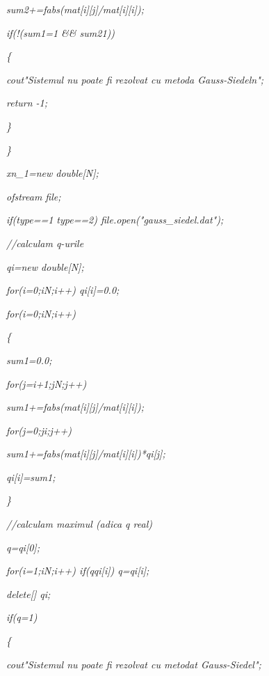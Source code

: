 \documentclass[a4paper,twoside]{book}
\begin{document}
\textit{\qquad \qquad \qquad sum2+=fabs(mat[i][j]/mat[i][i]);}

\textit{\qquad \qquad if(!(sum1\TEXTsymbol{<}=1 \&\& sum2\TEXTsymbol{<}1))}

\textit{\qquad \qquad \{}

\textit{\qquad \qquad \qquad cout\TEXTsymbol{<}\TEXTsymbol{<}"Sistemul nu
poate fi rezolvat cu metoda Gauss-Siedel\TEXTsymbol{\backslash}n";}

\textit{\qquad \qquad \qquad return -1;}

\textit{\qquad \qquad \}}

\textit{\qquad \}}

\textit{\qquad xn\_1=new double[N];}

\textit{\qquad ofstream file;}

\textit{\qquad if(type==1 \TEXTsymbol{\vert}\TEXTsymbol{\vert} type==2)
file.open("gauss\_siedel.dat");}

\textit{\qquad //calculam q-urile}

\textit{\qquad qi=new double[N];}

\textit{\qquad for(i=0;i\TEXTsymbol{<}N;i++) qi[i]=0.0;}

\textit{\qquad for(i=0;i\TEXTsymbol{<}N;i++)}

\textit{\qquad \{}

\textit{\qquad \qquad sum1=0.0;}

\textit{\qquad \qquad for(j=i+1;j\TEXTsymbol{<}N;j++)}

\textit{\qquad \qquad sum1+=fabs(mat[i][j]/mat[i][i]);}

\textit{\qquad \qquad for(j=0;j\TEXTsymbol{<}i;j++)}

\textit{\qquad \qquad \qquad sum1+=fabs(mat[i][j]/mat[i][i])*qi[j];}

\textit{\qquad \qquad qi[i]=sum1;}

\textit{\qquad \}}

\textit{\qquad //calculam maximul (adica q real)}

\textit{\qquad q=qi[0];}

\textit{\qquad for(i=1;i\TEXTsymbol{<}N;i++) if(q\TEXTsymbol{<}qi[i])
q=qi[i];}

\textit{\qquad delete[] qi;}

\textit{\qquad if(q\TEXTsymbol{>}=1)}

\textit{\qquad \{}

\textit{\qquad \qquad cout\TEXTsymbol{<}\TEXTsymbol{<}"Sistemul nu poate fi
rezolvat cu metodat Gauss-Siedel";}
\end{document}
